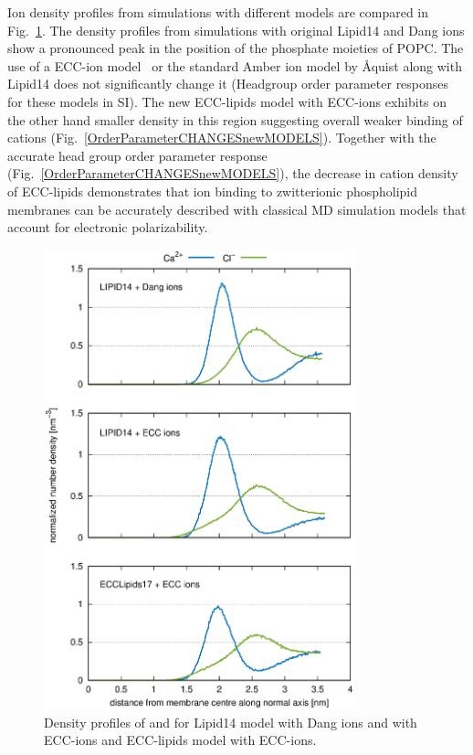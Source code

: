 \documentclass[aip,jcp,twocolumn]{revtex4}
\begin{document}
Ion density profiles from simulations with different models are compared in Fig.~\ref{fig:cacl-dens}.
The density profiles from simulations with original Lipid14 \cite{dickson14} and Dang ions \cite{smith94,chang1999,dang2006} 
show a pronounced peak in the position of the phosphate moieties of POPC. 
The use of a ECC-ion model~\cite{kohagen14,kohagen16} 
or the standard Amber ion model by \AA{quist} 
along with Lipid14 does not significantly change it 
(Headgroup order parameter responses for these models in SI).
The new ECC-lipids model with ECC-ions exhibits on the other hand smaller density in this region 
suggesting overall weaker binding of cations (Fig.~\ref{OrderParameterCHANGESnewMODELS}). 
Together with the accurate head group order parameter response (Fig.~\ref{OrderParameterCHANGESnewMODELS}),
the decrease in cation density of ECC-lipids demonstrates that 
ion binding to zwitterionic phospholipid membranes can be accurately
described with classical MD simulation models that account for electronic polarizability.

\begin{figure}[]
  \centering
  \includegraphics[width=9.0cm,angle=0]{../Fig/CAdensities.eps}
  \caption{\label{fig:cacl-dens}
    Density profiles of  and  for Lipid14 model with Dang ions
    and with ECC-ions and ECC-lipids model with ECC-ions. }
\end{figure}
\end{document}
